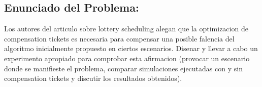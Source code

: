 \subsection{Enunciado del Problema:}
Los autores del articulo sobre lottery scheduling alegan que la optimizacion de compensation tickets es necesaria para compensar una posible falencia del algoritmo inicialmente propuesto en ciertos escenarios. Disenar y llevar a cabo un experimento apropiado para comprobar esta afirmacion (provocar un escenario donde se manifieste el problema, comparar simulaciones ejecutadas con y sin compensation tickets y discutir los resultados obtenidos).